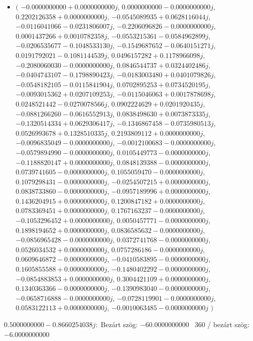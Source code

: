 \documentclass[14pt,a4paper]{article}
\begin{document}
\begin{itemize}
\item
$\big($
$-0.0000000000+0.0000000000j$, $0.0000000000-0.0000000000j$, $0.2202126358+0.0000000000j$, $-0.0545089935+0.0628116044j$, $-0.0116041066-0.0231806007j$, $-0.2206096826-0.0000000000j$, $0.0001437266+0.0010782358j$, $-0.0553215361-0.0584962899j$, $-0.0206535677-0.1048533130j$, $-0.1549687652-0.0640151271j$, $0.0191792021-0.1081144539j$, $0.0496157282+0.1178966098j$, $-0.2080060030-0.0000000000j$, $0.0846544737+0.0324402486j$, $-0.0404743107-0.1798890423j$, $-0.0183003480+0.0401079826j$, $-0.0548182105-0.0115841904j$, $0.0702895253+0.0734520195j$, $-0.0093015362+0.0207109253j$, $-0.0115046063+0.0017878698j$, $0.0248521442-0.0270078566j$, $0.0902224629+0.0201920435j$, $-0.0881266260-0.0616552913j$, $0.0838498630+0.0073873335j$, $-0.1320514334+0.0629306417j$, $-0.1346867458-0.0735980513j$, $0.0526993678+0.1328510335j$, $0.2193809112+0.0000000000j$, $-0.0096835049-0.0000000000j$, $-0.0012100683-0.0000000000j$, $-0.0579894990-0.0000000000j$, $0.0105449773-0.0000000000j$, $-0.1188820147+0.0000000000j$, $0.0848139388-0.0000000000j$, $0.0739741605-0.0000000000j$, $0.1055059470-0.0000000000j$, $0.1079298431-0.0000000000j$, $-0.0254507215+0.0000000000j$, $0.0838733860-0.0000000000j$, $-0.0957189996+0.0000000000j$, $0.1436204915+0.0000000000j$, $0.1200847182+0.0000000000j$, $0.0783369451+0.0000000000j$, $0.1767163237-0.0000000000j$, $-0.1053296452+0.0000000000j$, $0.0050457771-0.0000000000j$, $0.1898194652+0.0000000000j$, $0.0836585632-0.0000000000j$, $-0.0856965428-0.0000000000j$, $0.0372741768-0.0000000000j$, $0.0526034532+0.0000000000j$, $0.0757286186-0.0000000000j$, $0.0609646872-0.0000000000j$, $-0.0410583895-0.0000000000j$, $0.1605855588+0.0000000000j$, $-0.1480402292-0.0000000000j$, $-0.0854883853+0.0000000000j$, $0.3004421109+0.0000000000j$, $0.1340363366-0.0000000000j$, $-0.1390983040-0.0000000000j$, $-0.0658716888-0.0000000000j$, $-0.0728119901-0.0000000000j$, $0.0583122113+0.0000000000j$, $-0.0010063485-0.0000000000j$
$\big)$
\end{itemize}
$0.5000000000-0.8660254038j$:\
Bezárt szög: $-60.0000000000$ \
360 / bezárt szög: $-6.0000000000$\
\end{document}
